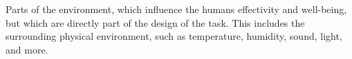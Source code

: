 \begin{definition} \label{def:ambient_environment} 
  Parts of the environment, which influence the humans effectivity and well-being, but which are directly part of the design of the task. This includes the surrounding physical environment, such as temperature, humidity, sound, light, and more. \cite[p. 27]{benyon14}
\end{definition}